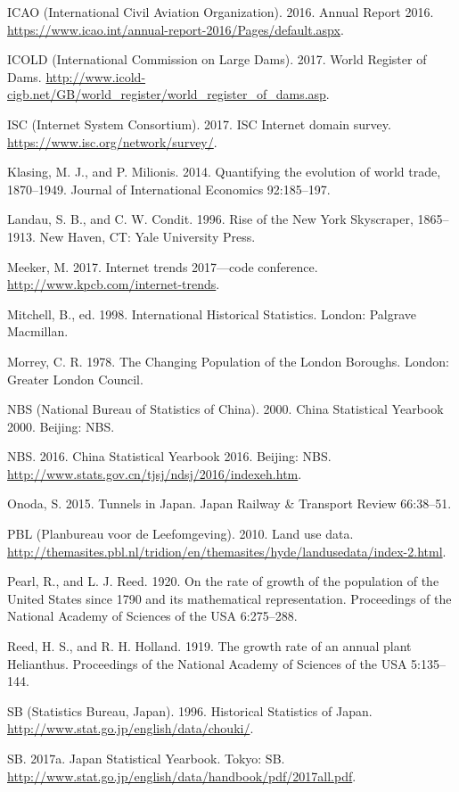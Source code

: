 ICAO (International Civil Aviation Organization). 2016. Annual Report 2016. \url{https://www.icao.int/annual-report-2016/Pages/default.aspx}.\par
ICOLD (International Commission on Large Dams). 2017. World Register of Dams. \url{http://www.icold-cigb.net/GB/world_register/world_register_of_dams.asp}.\par
ISC (Internet System Consortium). 2017. ISC Internet domain survey. \url{https://www.isc.org/network/survey/}.\par
Klasing, M. J., and P. Milionis. 2014. Quantifying the evolution of world trade, 1870–1949. Journal of International Economics 92:185–197.\par
Landau, S. B., and C. W. Condit. 1996. Rise of the New York Skyscraper, 1865–1913. New Haven, CT: Yale University Press.\par
Meeker, M. 2017. Internet trends 2017—code conference. \url{http://www.kpcb.com/internet-trends}.\par
Mitchell, B., ed. 1998. International Historical Statistics. London: Palgrave Macmillan.\par
Morrey, C. R. 1978. The Changing Population of the London Boroughs. London: Greater London Council.\par
NBS (National Bureau of Statistics of China). 2000. China Statistical Yearbook 2000. Beijing: NBS.\par
NBS. 2016. China Statistical Yearbook 2016. Beijing: NBS. \url{http://www.stats.gov.cn/tjsj/ndsj/2016/indexeh.htm}.\par
Onoda, S. 2015. Tunnels in Japan. Japan Railway \& Transport Review 66:38–51.\par
PBL (Planbureau voor de Leefomgeving). 2010. Land use data. \url{http://themasites.pbl.nl/tridion/en/themasites/hyde/landusedata/index-2.html}.\par
Pearl, R., and L. J. Reed. 1920. On the rate of growth of the population of the United States since 1790 and its mathematical representation. Proceedings of the National Academy of Sciences of the USA 6:275–288.\par
Reed, H. S., and R. H. Holland. 1919. The growth rate of an annual plant Helianthus. Proceedings of the National Academy of Sciences of the USA 5:135–144.\par
SB (Statistics Bureau, Japan). 1996. Historical Statistics of Japan. \url{http://www.stat.go.jp/english/data/chouki/}.\par
SB. 2017a. Japan Statistical Yearbook. Tokyo: SB. \url{http://www.stat.go.jp/english/data/handbook/pdf/2017all.pdf}.\par
